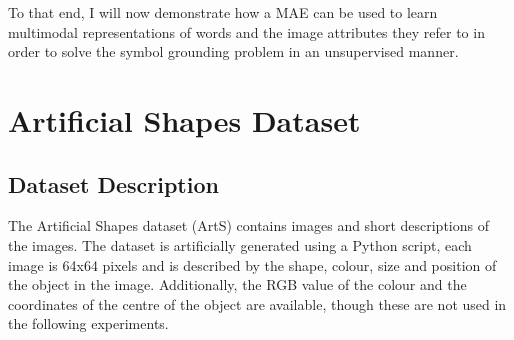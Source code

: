 To that end, I will now demonstrate how a MAE can be used to learn multimodal representations of words and the image attributes they refer to in order to solve the symbol grounding problem in an unsupervised manner.


\section{Artificial Shapes Dataset}
\subsection{Dataset Description}
The Artificial Shapes dataset (ArtS) contains images and short descriptions of the images. The dataset is artificially generated using a Python script, each image is 64x64 pixels and is described by the shape, colour, size and position of the object in the image. Additionally, the RGB value of the colour and the coordinates of the centre of the object are available, though these are not used in the following experiments. 

